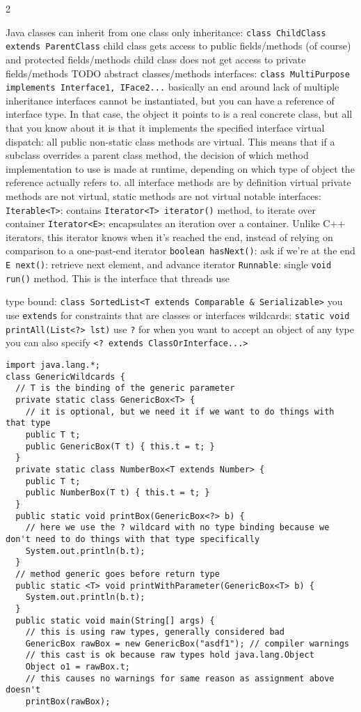 \documentclass{article}
\def \columncount {2}
\newcommand{\codesize}{8.5}
\newcommand{\java}[1]{{\fontsize{\codesize}{\codesize}\selectfont\texttt{#1}}}
\begin{document}
\begin{multicols}{\columncount}
\begin{outline}[longenum]
  \1 Java classes can inherit from one class only
    \2 inheritance: \java{class ChildClass extends ParentClass}
    \2 child class gets access to public fields/methods (of course) and protected fields/methods
    \2 child class does not get access to private fields/methods
    \2 TODO abstract classes/methods
  \1 interfaces: \java{class MultiPurpose implements Interface1, IFace2...}
    \2 basically an end around lack of multiple inheritance
    \2 interfaces cannot be instantiated, but you can have a reference of interface type. In that case, the object it points to is a real concrete class, but all that you know about it is that it implements the specified interface
  \1 virtual dispatch:
    \2 all public non-static class methods are virtual.
      This means that if a subclass overrides a parent class method, the decision of which method implementation to use is made at runtime, depending on which type of object the reference actually refers to.
    \2 all interface methods are by definition virtual
    \2 private methods are not virtual, static methods are not virtual
  \1 notable interfaces:
    \2 \java{Iterable<T>}: contains \java{Iterator<T> iterator()} method, to iterate over container
    \2 \java{Iterator<E>}: encapsulates an iteration over a container. Unlike C++ iterators, this iterator knows when it's reached the end, instead of relying on comparison to a one-past-end iterator
      \3 \java{boolean hasNext()}: ask if we're at the end
      \3 \java{E next()}: retrieve next element, and advance iterator
    \2 \java{Runnable}: single \java{void run()} method. This is the interface that threads use

  \1 type bound: \java{class SortedList<T extends Comparable & Serializable>}
    \2 you use \java{extends} for constraints that are classes or interfaces
  \1 wildcards: \java{static void printAll(List<?> lst)} use \java{?} for when you want to accept an object of any type
    \2 you can also specify \java{<? extends ClassOrInterface...>}
    \2 
\0\begin{verbatim}
import java.lang.*;
class GenericWildcards {
  // T is the binding of the generic parameter
  private static class GenericBox<T> {
    // it is optional, but we need it if we want to do things with that type
    public T t;
    public GenericBox(T t) { this.t = t; }
  }
  private static class NumberBox<T extends Number> {
    public T t;
    public NumberBox(T t) { this.t = t; } 
  }
  public static void printBox(GenericBox<?> b) {
    // here we use the ? wildcard with no type binding because we don't need to do things with that type specifically
    System.out.println(b.t);
  }
  // method generic goes before return type
  public static <T> void printWithParameter(GenericBox<T> b) {
    System.out.println(b.t);
  }
  public static void main(String[] args) {
    // this is using raw types, generally considered bad
    GenericBox rawBox = new GenericBox("asdf1"); // compiler warnings
    // this cast is ok because raw types hold java.lang.Object
    Object o1 = rawBox.t;
    // this causes no warnings for same reason as assignment above doesn't
    printBox(rawBox);
    

\end{verbatim}
\end{outline}
\end{multicols}
\end{document}
